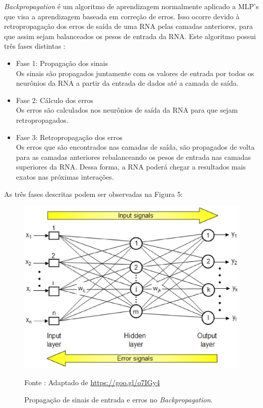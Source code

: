 \textit{Backpropagation} é um algoritmo de aprendizagem normalmente aplicado a MLP's que visa a aprendizagem baseada em correção de erros. Isso ocorre devido à retropropagação dos erros de saída de uma RNA pelas camadas anteriores, para que assim sejam balanceados os pesos de entrada da RNA.
Este algoritmo possui três fases distintas \cite{netto2006}:

\begin{itemize}
    \item Fase 1: Propagação dos sinais \\ Os sinais são propagados juntamente com os valores de entrada por todos os neurônios da RNA a partir da entrada de dados até a camada de saída.
    \item Fase 2: Cálculo dos erros \\ Os erros são calculados nos neurônios de saída da RNA para que sejam retropropagados.
    \item Fase 3: Retropropagação dos erros \\ Os erros que são encontrados nas camadas de saída, são propagados de volta para as camadas anteriores rebalanceando os pesos de entrada nas camadas superiores da RNA. Dessa forma, a RNA poderá chegar a resultados mais exatos nas próximas interações.
\end{itemize}

As três fases descritas podem ser observadas na Figura 5:

\begin{figure}[ht]
        \centering
        \label{fig05}
            \includegraphics[keepaspectratio=true, scale=0.4]{editaveis/images/backprop.eps}
        \caption{Propagação de sinais de entrada e erros no \textit{Backpropagation}.}
        Fonte : Adaptado de \url{https://goo.gl/o7IGy4}
\end{figure}

